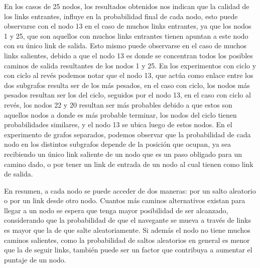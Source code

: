 En los casos de 25 nodos, los resultados obtenidos nos indican que la calidad de los links entrantes, influye en la probabilidad final de cada nodo, esto puede observarse con el nodo 13 en el caso de muchos links entrantes, ya que los nodos 1 y 25, que son aquellos con muchos links entrantes tienen apuntan a este nodo con su \'unico link de salida. Esto mismo puede observarse en el caso de muchos links salientes, debido a que el nodo 13 es donde se concentran todos los posibles caminos de salida resultantes de los nodos 1 y 25.
En los experimentos con ciclo y con ciclo al rev\'es podemos notar que el nodo 13, que act\'ua como enlace entre los dos subgrafos resulta ser de los m\'as pesados, en el caso con ciclo, los nodos m\'as pesados resultan ser los del ciclo, seguidos por el nodo 13, en el caso con ciclo al rev\'es, los nodos 22 y 20 resultan ser m\'as probables debido a que estos son aquellos nodos a donde es m\'as probable terminar, los nodos del ciclo tienen probabilidades similares, y el nodo 13 se ubica luego de estos nodos.
En el experimento de grafos separados, podemos observar que la probabilidad de cada nodo en los distintos subgrafos depende de la posici\'on que ocupan, ya sea recibiendo un \'unico link saliente de un nodo que es un paso obligado para un camino dado, o por tener un link de entrada de un nodo al cual tienen como link de salida.

En resumen, a cada nodo se puede acceder de dos maneras: por un salto aleatorio o por un link desde otro nodo. Cuantos más caminos alternativos existan para llegar a un nodo se espera que tenga mayor posibilidad de ser alcanzado, considerando que la probabilidad de que el navegante se mueva a través de links es mayor que la de que salte aleatoriamente. Si además el nodo no tiene muchos caminos salientes, como la probabilidad de saltos aleatorios en general es menor que la de seguir links, también puede ser un factor que contribuya a aumentar el puntaje de un nodo.